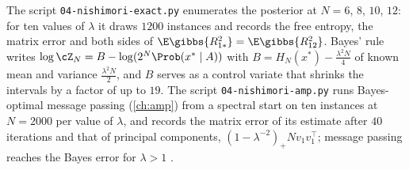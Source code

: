 \begin{refsection}
The script \texttt{04-nishimori-exact.py} enumerates the posterior at $N=6$, $8$, $10$, $12$: for ten values of $\lambda$ it draws $1200$ instances and records the free entropy, the matrix error and both sides of $\E\gibbs{R_{1*}^2}=\E\gibbs{R_{12}^2}$. Bayes' rule writes $\log\cZ_N=B-\log(2^N\Prob(x^*\mid A))$ with $B=H_N(x^*)-\frac{\lambda^2N}4$ of known mean and variance $\frac{\lambda^2N}2$, and $B$ serves as a control variate that shrinks the intervals by a factor of up to $19$. The script \texttt{04-nishimori-amp.py} runs Bayes-optimal message passing (\cref{ch:amp}) from a spectral start on ten instances at $N=2000$ per value of $\lambda$, and records the matrix error of its estimate after $40$ iterations and that of principal components, $(1-\lambda^{-2})_+Nv_1v_1^\top$; message passing reaches the Bayes error for $\lambda>1$ \parencite{DeshpandeAbbeMontanari2016,MontanariVenkataramanan2021}.


\end{refsection}
